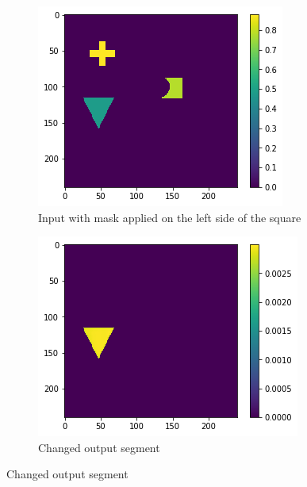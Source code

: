 \begin{figure}[H]
    \centering
    \begin{subfigure}[t]{.33\textwidth}
        \centering
        \includegraphics[width=\linewidth]{chapters/06_hdm/images_analyze/2a_masked.png}
        \caption{Input with mask applied on the left side of the square}
    \end{subfigure}%
    \begin{subfigure}[t]{.33\textwidth}
        \centering
        \includegraphics[width=\linewidth]{chapters/06_hdm/images_analyze/2b_segment.png}
        \caption{Changed output segment}
    \end{subfigure}

\end{figure}
